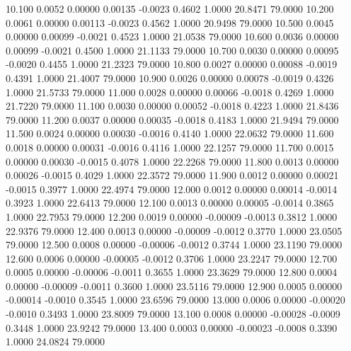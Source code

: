   10.100   0.0052   0.00000   0.00135  -0.0023   0.4602   1.0000  20.8471  79.0000
  10.200   0.0061   0.00000   0.00113  -0.0023   0.4562   1.0000  20.9498  79.0000
  10.500   0.0045   0.00000   0.00099  -0.0021   0.4523   1.0000  21.0538  79.0000
  10.600   0.0036   0.00000   0.00099  -0.0021   0.4500   1.0000  21.1133  79.0000
  10.700   0.0030   0.00000   0.00095  -0.0020   0.4455   1.0000  21.2323  79.0000
  10.800   0.0027   0.00000   0.00088  -0.0019   0.4391   1.0000  21.4007  79.0000
  10.900   0.0026   0.00000   0.00078  -0.0019   0.4326   1.0000  21.5733  79.0000
  11.000   0.0028   0.00000   0.00066  -0.0018   0.4269   1.0000  21.7220  79.0000
  11.100   0.0030   0.00000   0.00052  -0.0018   0.4223   1.0000  21.8436  79.0000
  11.200   0.0037   0.00000   0.00035  -0.0018   0.4183   1.0000  21.9494  79.0000
  11.500   0.0024   0.00000   0.00030  -0.0016   0.4140   1.0000  22.0632  79.0000
  11.600   0.0018   0.00000   0.00031  -0.0016   0.4116   1.0000  22.1257  79.0000
  11.700   0.0015   0.00000   0.00030  -0.0015   0.4078   1.0000  22.2268  79.0000
  11.800   0.0013   0.00000   0.00026  -0.0015   0.4029   1.0000  22.3572  79.0000
  11.900   0.0012   0.00000   0.00021  -0.0015   0.3977   1.0000  22.4974  79.0000
  12.000   0.0012   0.00000   0.00014  -0.0014   0.3923   1.0000  22.6413  79.0000
  12.100   0.0013   0.00000   0.00005  -0.0014   0.3865   1.0000  22.7953  79.0000
  12.200   0.0019   0.00000  -0.00009  -0.0013   0.3812   1.0000  22.9376  79.0000
  12.400   0.0013   0.00000  -0.00009  -0.0012   0.3770   1.0000  23.0505  79.0000
  12.500   0.0008   0.00000  -0.00006  -0.0012   0.3744   1.0000  23.1190  79.0000
  12.600   0.0006   0.00000  -0.00005  -0.0012   0.3706   1.0000  23.2247  79.0000
  12.700   0.0005   0.00000  -0.00006  -0.0011   0.3655   1.0000  23.3629  79.0000
  12.800   0.0004   0.00000  -0.00009  -0.0011   0.3600   1.0000  23.5116  79.0000
  12.900   0.0005   0.00000  -0.00014  -0.0010   0.3545   1.0000  23.6596  79.0000
  13.000   0.0006   0.00000  -0.00020  -0.0010   0.3493   1.0000  23.8009  79.0000
  13.100   0.0008   0.00000  -0.00028  -0.0009   0.3448   1.0000  23.9242  79.0000
  13.400   0.0003   0.00000  -0.00023  -0.0008   0.3390   1.0000  24.0824  79.0000

